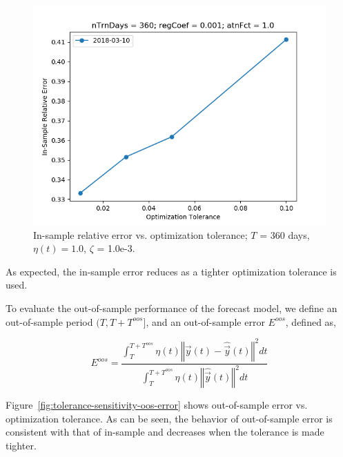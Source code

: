 \documentclass{article}
\begin{document}
\begin{figure}\label{fig:tolerance-sensitivity-error}
\includegraphics[bb=0 0 640 480]{figures/tolerance-sensitivity-error.png}
\caption{In-sample relative error vs. optimization tolerance; $T$ =
  360 days, $\eta(t) = 1.0$, $\zeta$ = 1.0e-3.}
\end{figure}

As expected, the in-sample error reduces as a tighter optimization
tolerance is used.

To evaluate the out-of-sample performance of the forecast model, we
define an out-of-sample period $(T,T+T^{oos}]$, and an out-of-sample
  error $E^{oos}$, defined as,

\begin{equation}\label{eqn:out-of-sample-error}
E^{oos} = \frac{\int_{T}^{T+T^{oos}} \eta(t) \left\Vert \vec{y}(t) -
  \hat{\vec{y}}(t) \right\Vert^{2} dt}{\int_{T}^{T+T^{oos}} \eta(t)
  \left\Vert \hat{\vec{y}}(t) \right\Vert^{2} dt}
\end{equation}

Figure~\ref{fig:tolerance-sensitivity-oos-error} shows out-of-sample
error vs. optimization tolerance. As can be seen, the behavior of
out-of-sample error is consistent with that of in-sample and decreases
when the tolerance is made tighter.
\end{document}
